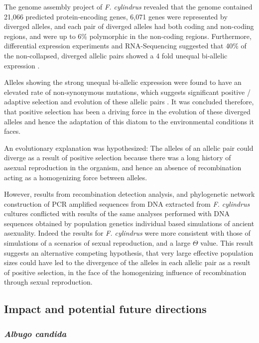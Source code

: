 The genome assembly project of \textit{F. cylindrus} revealed that the genome contained 21,066 predicted protein-encoding genes, 6,071 genes were represented by diverged alleles, and each pair of diverged alleles had both coding and non-coding regions, and were up to 6\% polymorphic in the non-coding regions.
Furthermore, differential expression experiments and RNA-Sequencing suggested that 40\% of
the non-collapsed, diverged allelic pairs showed a 4 fold unequal bi-allelic
expression \parencite{Mock2017}.

Alleles showing the strong unequal bi-allelic expression were found to have an
elevated rate of non-synonymous mutations, which suggests significant positive
/ adaptive selection and evolution of these allelic pairs \parencite{Mock2017}.
It was concluded therefore, that positive selection has been a driving force in
the evolution of these diverged alleles and hence the adaptation of this diatom to the
environmental conditions it faces.

An evolutionary explanation was hypothesized: The alleles of an allelic pair could diverge as a result of positive selection because there was a long history of asexual reproduction in the organism, and hence an absence of recombination acting as a homogenizing force between alleles.

However, results from recombination detection analysis, and phylogenetic network construction of PCR amplified sequences from DNA extracted from \textit{F. cylindrus} cultures conflicted with results of the same analyses performed with DNA sequences obtained by population genetics individual based simulations of ancient asexuality.
Indeed the results for \textit{F. cylindrus} were more consistent with those of simulations of a scenarios of sexual reproduction, and a large $\Theta$ value.
This result suggests an alternative competing hypothesis, that very large effective population sizes could have led to the divergence of the alleles in each allelic pair as a result of positive selection, in the face of the homogenizing influence of recombination through sexual reproduction.


\subsection{Impact and potential future directions}

\subsubsection{\textit{Albugo candida}}

